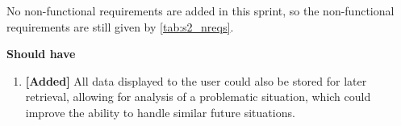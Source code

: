 No non-functional requirements are added in this sprint, so the non-functional requirements are still given by \cref{tab:s2_nreqs}.

\textbf{Should have}
\begin{enumerate}[resume]
    
    \item \textbf{[Added]} All data displayed to the user could also be stored for later retrieval, allowing for analysis of a problematic situation, which could improve the ability to handle similar future situations.
    
\end{enumerate}
